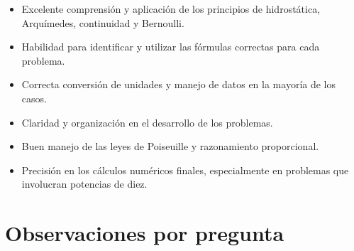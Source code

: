 \documentclass[11pt,a4paper]{article}
\begin{document}
\vspace{4pt}
\begin{minipage}[t]{0.48\linewidth}
  \begin{tcolorbox}[cajaFortaleza, title={Fortalezas}]
\begin{itemize}[leftmargin=1.5em, itemsep=2pt]
  \item Excelente comprensión y aplicación de los principios de hidrostática, Arquímedes, continuidad y Bernoulli.
  \item Habilidad para identificar y utilizar las fórmulas correctas para cada problema.
  \item Correcta conversión de unidades y manejo de datos en la mayoría de los casos.
  \item Claridad y organización en el desarrollo de los problemas.
  \item Buen manejo de las leyes de Poiseuille y razonamiento proporcional.
\end{itemize}
  \end{tcolorbox}
\end{minipage}
\hfill
\begin{minipage}[t]{0.48\linewidth}
  \begin{tcolorbox}[cajaMejora, title={Areas de mejora}]
\begin{itemize}[leftmargin=1.5em, itemsep=2pt]
  \item Precisión en los cálculos numéricos finales, especialmente en problemas que involucran potencias de diez.
\end{itemize}
  \end{tcolorbox}
\end{minipage}

\section*{Observaciones por pregunta}
\end{document}
